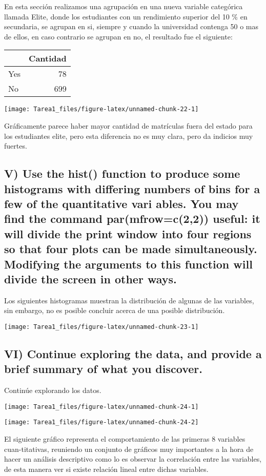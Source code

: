 \documentclass[
  12pt,
  letterpaper,
]{article}
\begin{document}
En esta sección realizamos una agrupación en una nueva variable
categórica llamada Elite, donde los estudiantes con un rendimiento
superior del 10 \% en secundaria, se agrupan en si, siempre y cuando la
universidad contenga 50 o mas de ellos, en caso contrario se agrupan en
no, el resultado fue el siguiente:

\begin{tabular}{l|r}
\hline
  & Cantidad\\
\hline
Yes & 78\\
\hline
No & 699\\
\hline
\end{tabular}

\begin{center}\texttt{[image: Tarea1\_files/figure-latex/unnamed-chunk-22-1]} \end{center}

Gráficamente parece haber mayor cantidad de matrículas fuera del estado
para los estudiantes elite, pero esta diferencia no es muy clara, pero
da indicios muy fuertes.

\subsection{V) Use the hist() function to produce some histograms with differing numbers of bins for a few of the quantitative vari ables. You may find the command par(mfrow=c(2,2)) useful: it will divide the print window into four regions so that four plots can be made simultaneously. Modifying the arguments to this function will divide the screen in other ways.}

Los siguientes histogramas muestran la distribución de algunas de las
variables, sin embargo, no es posible concluir acerca de una posible
distribución.

\begin{center}\texttt{[image: Tarea1\_files/figure-latex/unnamed-chunk-23-1]} \end{center}

\subsection{VI) Continue exploring the data, and provide a brief summary of what you discover.}

Continúe explorando los datos.

\begin{center}\texttt{[image: Tarea1\_files/figure-latex/unnamed-chunk-24-1]} \end{center}

\begin{center}\texttt{[image: Tarea1\_files/figure-latex/unnamed-chunk-24-2]} \end{center}

El siguiente gráfico representa el comportamiento de las primeras 8
variables cuan-titativas, reuniendo un conjunto de gráficos muy
importantes a la hora de hacer un análisis descriptivo como lo es
observar la correlación entre las variables, de esta manera ver si
existe relación lineal entre dichas variables.
\end{document}
